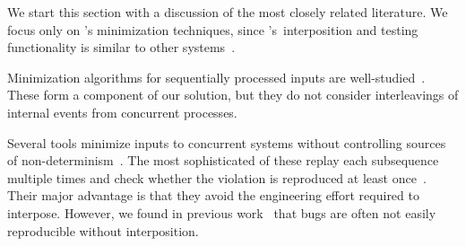 
%

We start this section with a discussion of the most closely
related literature. We focus only on \sys's minimization techniques, since
\sys's~interposition and testing functionality is similar to other
systems~\cite{lin2009modist,simsa2010dbug,leesatapornwongsa2014samc}.

 Minimization
algorithms for sequentially processed inputs are
well-studied~\cite{Zeller:2002:SIF:506201.506206,claessen2000quickcheck,regehr2012test,whitaker2004configuration,burger2011minimizing,fse_web_ddmin,chang2007simulation}.
These form a component of our solution, but they do not consider
interleavings of internal events from concurrent processes.

 Several
tools minimize inputs to concurrent
systems without controlling sources of non-determinism~\cite{arts2006testing,clause2007technique,tucek2007triage,jin2013f3,hughes2011testing}.
The most sophisticated of these replay each subsequence
multiple times and check whether the violation is reproduced at least once~\cite{hughes2011testing,claessen2009finding}.
Their major advantage is that they avoid the engineering effort required to
interpose. However, we found in previous
work~\cite{sts2014} that bugs are often not easily reproducible without
interposition.

